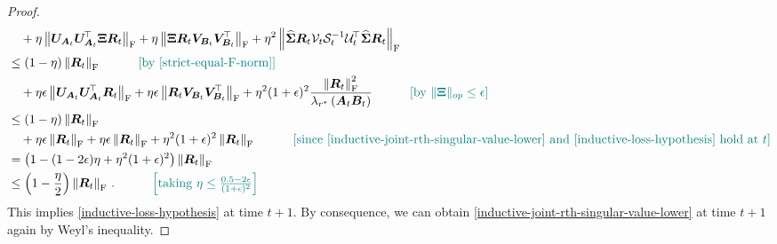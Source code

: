 \begin{proof}
\begin{align*}
        & \quad + \eta \left\|\bm U_{\bm A_t} \bm U_{\bm A_t}^{\!\top}\bm \Xi\bm R_t\right\|_{\rm F} + \eta \left\|\bm \Xi\bm R_t\bm V_{\bm B_t} \bm V_{\bm B_t}^{\!\top}\right\|_{\rm F}
        + \eta^2 \left\|\widehat{\bm \Sigma}\bm R_t\mathcal{V}_t \mathcal{S}^{-1}_t \mathcal{U}_t^{\!\top}\widehat{\bm \Sigma}\bm R_t\right\|_{\rm F}\\
        & \leq (1-\eta)\left\|\bm R_t\right\|_{\rm F}\quad \tag*{\color{teal}[by \cref{strict-equal-F-norm}]}\\
        & \quad + \eta \epsilon \left\|\bm U_{\bm A_t} \bm U_{\bm A_t}^{\!\top}\bm R_t\right\|_{\rm F} + \eta \epsilon \left\|\bm R_t\bm V_{\bm B_t} \bm V_{\bm B_t}^{\!\top}\right\|_{\rm F}
        + \eta^2 (1+\epsilon)^2 \frac{\left\|\bm R_t\right\|^2_{\rm F}}{\lambda_{r^*}\left(\bm A_t \bm B_t\right)} \quad \tag*{\color{teal}$\left[\text{by }\|\bm \Xi\|_{op}\leq \epsilon\right]$}\\
        & \leq (1-\eta)\left\|\bm R_t\right\|_{\rm F}\\
        & \quad + \eta \epsilon \left\|\bm R_t\right\|_{\rm F} + \eta \epsilon \left\|\bm R_t\right\|_{\rm F}
        + \eta^2 (1+\epsilon)^2 \left\|\bm R_t\right\|_{\rm F}\quad \tag*{\color{teal}$\left[\text{since \cref{inductive-joint-rth-singular-value-lower} and \cref{inductive-loss-hypothesis} hold at }t\right]$}\\
        & = \left(1-(1-2\epsilon)\eta +\eta^2(1+\epsilon)^2\right)\left\|\bm R_t\right\|_{\rm F}\\
        & \leq \left(1-\frac{\eta}{2}\right)\left\|\bm R_t\right\|_{\rm F}\,.\quad \tag*{\color{teal}$\left[\text{taking}~\eta \leq \frac{0.5-2\epsilon}{(1+\epsilon)^2} \right]$}
    \end{align*}
    This implies \cref{inductive-loss-hypothesis} at time $t+1$. By consequence, we can obtain \cref{inductive-joint-rth-singular-value-lower} at time $t+1$ again by Weyl's inequality.
\end{proof}
